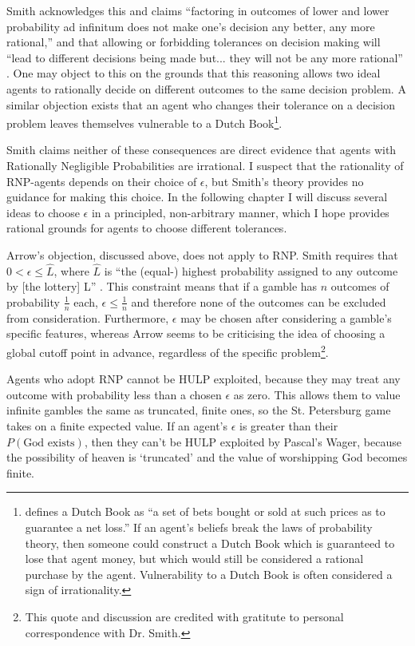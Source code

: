 \documentclass{article}
\begin{document}
Smith acknowledges this and claims ``factoring in outcomes of lower and lower probability ad infinitum does not make one’s decision any better, any more rational,'' and that allowing or forbidding tolerances on decision making will ``lead to different decisions being made \textemdash{} but... they will not be any more rational'' \citep[pg. 475]{smith2014evaluative}. One may object to this on the grounds that this reasoning allows two ideal agents to rationally decide on different outcomes to the same decision problem. A similar objection exists that an agent who changes their tolerance on a decision problem leaves themselves vulnerable to a Dutch Book\footnote{\citep{hajek2008dutch} defines a Dutch Book as ``a set of bets bought or sold at such prices as to guarantee a net loss.'' If an agent's beliefs break the laws of probability theory, then someone could construct a Dutch Book which is guaranteed to lose that agent money, but which would still be considered a rational purchase by the agent. Vulnerability to a Dutch Book is often considered a sign of irrationality.}. 

Smith claims neither of these consequences are direct evidence that agents with Rationally Negligible Probabilities are irrational. I suspect that the rationality of RNP-agents depends on their choice of \(\epsilon\), but Smith's theory provides no guidance for making this choice. In the following chapter I will discuss several ideas to choose \(\epsilon\) in a principled, non-arbitrary manner, which I hope provides rational grounds for agents to choose different tolerances. 

Arrow's objection, discussed above, does not apply to RNP. Smith requires that \(0 < \epsilon \leq \hat{L}\), where \(\hat{L}\) is ``the (equal-) highest probability assigned to any outcome by [the lottery] L'' \citep[pg. 479]{smith2014evaluative}. This constraint means that if a gamble has \(n\) outcomes of probability \(\frac{1}{n}\) each, \(\epsilon \leq \frac{1}{n}\) and therefore none of the outcomes can be excluded from consideration. Furthermore, \(\epsilon\) may be chosen after considering a gamble's specific features, whereas Arrow seems to be criticising the idea of choosing a global cutoff point in advance, regardless of the specific problem\footnote{This quote and discussion are credited with gratitute to personal correspondence with Dr. Smith.}.

Agents who adopt RNP cannot be HULP exploited, because they may treat any outcome with probability less than a chosen \(\epsilon\) as zero. This allows them to value infinite gambles the same as truncated, finite ones, so the St. Petersburg game takes on a finite expected value. If an agent's \(\epsilon\) is greater than their \(P(\text{God exists})\), then they can't be HULP exploited by Pascal's Wager, because the possibility of heaven is `truncated' and the value of worshipping God becomes finite.
\end{document}
